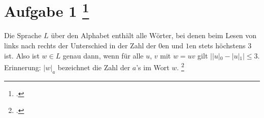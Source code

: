 \documentclass{bschlangaul-aufgabe}
\begin{document}
\let\l=\bLeereZelle
\let\f=\bFussnote
\def\z#1{
  \bZustandsMengenSammlungNr{#1}{
    {
      {0} {0}
      {1} {0,1}
      {2} {0,2}
      {3} {0,1,2}
    }
  }
}
\let\s=\bZustandsnameGross
\let\Z=\bZustandsPaar


\section{Aufgabe 1
\footcite{examen:66115:2015:03}}

Die Sprache $L$ über den Alphabet  enthält alle Wörter,
bei denen beim Lesen von links nach rechts der Unterschied in der Zahl
der $0$en und $1$en stets höchstens $3$ ist. Also ist $w \in L$ genau
dann, wenn für alle $u$, $v$ mit $w = uv$ gilt $||u|_0 - |u|_1| \leq 3$.
Erinnerung: $|w|_a$ bezeichnet die Zahl der $a$’s im Wort $w$.
\footcite[Aufgabe 10]{theo:ab:1}
\end{document}
